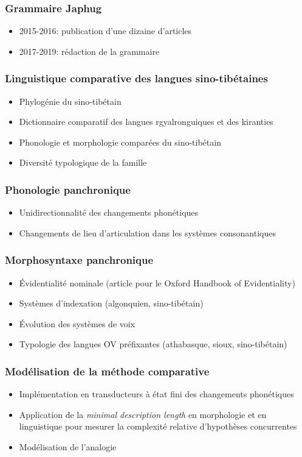 \documentclass[xcolor=table]{beamer}
\begin{document}
   \begin{frame} 
 \frametitle{Grammaire Japhug} 
 \begin{itemize}%
 \item 2015-2016: publication d'une dizaine d'articles
\item 2017-2019: rédaction de la grammaire
\end{itemize}
   \end{frame} 
   
   \begin{frame} 
 \frametitle{Linguistique comparative des langues sino-tibétaines} 
 \begin{itemize}%
 \item Phylogénie du sino-tibétain
  \item Dictionnaire comparatif des langues rgyalronguiques et des kiranties
  \item Phonologie et morphologie comparées du sino-tibétain
 \item Diversité typologique de la famille 
\end{itemize}
   \end{frame} 

   \begin{frame} 
 \frametitle{Phonologie panchronique} 
 \begin{itemize}%
 \item Unidirectionnalité des changements phonétiques
 \item Changements de lieu d'articulation dans les systèmes consonantiques
\end{itemize}
   \end{frame} 

   \begin{frame} 
 \frametitle{Morphosyntaxe panchronique} 
 \begin{itemize}%
 \item Évidentialité nominale (article pour le Oxford Handbook of Evidentiality)
 \item Systèmes d'indexation (algonquien, sino-tibétain)
 \item Évolution des systèmes de voix
 \item Typologie des langues OV préfixantes (athabasque, sioux, sino-tibétain)
\end{itemize}
   \end{frame} 

   \begin{frame} 
 \frametitle{Modélisation de la méthode comparative} 
 \begin{itemize}%
 \item  Implémentation en transducteurs à état fini des changements phonétiques
  \item Application de la \textit{minimal description length} en morphologie et en linguistique pour mesurer la complexité relative d'hypothèses concurrentes
  \item Modélisation de l'analogie
\end{itemize}
   \end{frame} 
\end{document}
